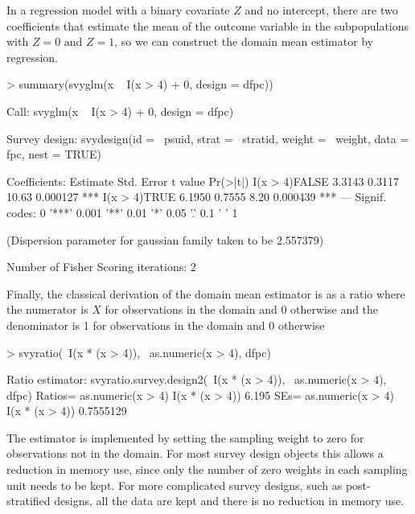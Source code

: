 \documentclass{article}
\begin{document}
In a regression model with a binary covariate $Z$ and no intercept,
there are two coefficients that estimate the mean of the outcome
variable in the subpopulations with $Z=0$ and $Z=1$, so we can
construct the domain mean estimator by regression.
\begin{Schunk}
\begin{Sinput}
> summary(svyglm(x ~ I(x > 4) + 0, design = dfpc))
\end{Sinput}
\begin{Soutput}
Call:
svyglm(x ~ I(x > 4) + 0, design = dfpc)

Survey design:
svydesign(id = ~psuid, strat = ~stratid, weight = ~weight, data = fpc, 
    nest = TRUE)

Coefficients:
              Estimate Std. Error t value Pr(>|t|)    
I(x > 4)FALSE   3.3143     0.3117   10.63 0.000127 ***
I(x > 4)TRUE    6.1950     0.7555    8.20 0.000439 ***
---
Signif. codes:  0 '***' 0.001 '**' 0.01 '*' 0.05 '.' 0.1 ' ' 1 

(Dispersion parameter for gaussian family taken to be 2.557379)

Number of Fisher Scoring iterations: 2
\end{Soutput}
\end{Schunk}

Finally, the classical derivation of the domain mean estimator is as a
ratio where the numerator is $X$ for observations in the domain and 0
otherwise and the denominator is 1 for observations in the domain and
0 otherwise
\begin{Schunk}
\begin{Sinput}
> svyratio(~I(x * (x > 4)), ~as.numeric(x > 4), dfpc)
\end{Sinput}
\begin{Soutput}
Ratio estimator: svyratio.survey.design2(~I(x * (x > 4)), ~as.numeric(x > 4), 
    dfpc)
Ratios=
               as.numeric(x > 4)
I(x * (x > 4))             6.195
SEs=
               as.numeric(x > 4)
I(x * (x > 4))         0.7555129
\end{Soutput}
\end{Schunk}

The estimator is implemented by setting the sampling weight to zero
for observations not in the domain.  For most survey design objects
this allows a reduction in memory use, since only the number of zero
weights in each sampling unit needs to be kept. For more complicated
survey designs, such as post-stratified designs, all the data are kept
and there is no reduction in memory use.
\end{document}

